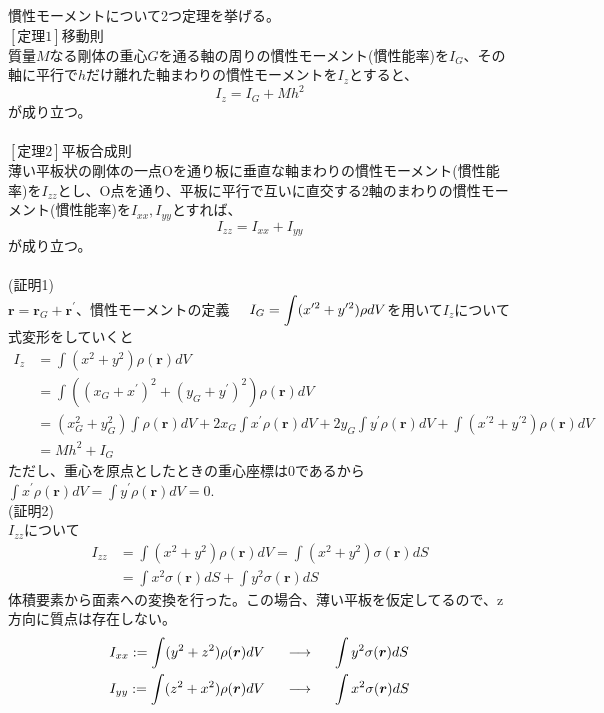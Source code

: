\documentclass{jsarticle}
\begin{document}
\newpage
\noindent
慣性モーメントについて2つ定理を挙げる。\\
\(\left[定理1\right]\)\hspace{5mm}移動則\\
質量\(M\)なる剛体の重心\(G\)を通る軸の周りの慣性モーメント(慣性能率)を\(I_{G}\)、その軸に平行で\(h\)だけ離れた軸まわりの慣性モーメントを\(I_{z}\)とすると、
\begin{equation}
I_{z}=I_{G}+Mh^{2}
\end{equation}
が成り立つ。\\
\\
\(\left[定理2\right]\)\hspace{5mm}平板合成則\\
薄い平板状の剛体の一点Oを通り板に垂直な軸まわりの慣性モーメント(慣性能率)を\(I_{zz}\)とし、O点を通り、平板に平行で互いに直交する2軸のまわりの慣性モーメント(慣性能率)を\(I_{xx},I_{yy}\)とすれば、
\begin{equation}
I_{zz}=I_{xx}+I_{yy}
\end{equation}
が成り立つ。\\
\\
(証明1)\\
\(\bm{r}=\bm{r}_{G}+\bm{r}^{\prime}\)、慣性モーメントの定義\(\hspace{5mm}\displaystyle I_{G}=\int(x^{\prime2}+y^{\prime2})\rho dV\)を用いて\(I_{z}\)について式変形をしていくと
\begin{align*}
I_{z}&=\int(x^{2}+y^{2})\rho(\bm{r})dV\\
&=\int\left((x_{G}+x^{\prime})^{2}+(y_{G}+y^{\prime})^{2}\right)\rho(\bm{r})dV\\
&=(x_{G}^{2}+y_{G}^{2})\int\rho(\bm{r})dV+2x_{G}\int x^{\prime}\rho(\bm{r})dV+2y_{G}\int y^{\prime}\rho(\bm{r})dV+\int(x^{\prime2}+y^{\prime2})\rho(\bm{r})dV\\
&=Mh^{2}+I_{G}
\end{align*}
ただし、重心を原点としたときの重心座標は0であるから\(\displaystyle\int x^{\prime}\rho(\bm{r})dV=\int y^{\prime}\rho(\bm{r})dV=0\).\\
(証明2)\\
\(I_{zz}\)について
\begin{align*}
I_{zz}&=\int(x^{2}+y^{2})\rho(\bm{r})dV=\int(x^{2}+y^{2})\sigma(\bm{r})dS\\
&=\int x^{2}\sigma(\bm{r})dS+\int y^{2}\sigma(\bm{r})dS
\end{align*}
体積要素から面素への変換を行った。この場合、薄い平板を仮定してるので、z方向に質点は存在しない。
\begin{align*}
&I_{xx}:=\int(y^{2}+z^{2})\rho (\bm{r})dV\hspace{5mm}\longrightarrow\hspace{5mm}\int y^{2}\sigma(\bm{r}) dS\\
&I_{yy}:=\int(z^{2}+x^{2})\rho (\bm{r})dV\hspace{5mm}\longrightarrow\hspace{5mm}\int x^{2}\sigma(\bm{r}) dS
\end{align*}
\end{document}
